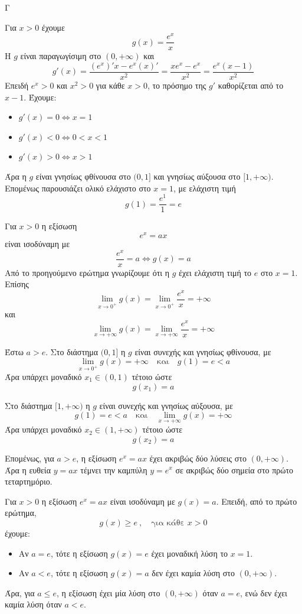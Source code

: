 \begin{thema}{Γ}
\begin{erwthma}
\item Για $x>0$ έχουμε
\[g(x)=\frac{e^x}{x}\]
Η $g$ είναι παραγωγίσιμη στο $(0,+\infty)$ και
\[g'(x)=\frac{(e^x)'x-e^x(x)'}{x^2}=\frac{xe^x-e^x}{x^2}=\frac{e^x(x-1)}{x^2}\]
Επειδή $e^x>0$ και $x^2>0$ για κάθε $x>0$, το πρόσημο της $g'$ καθορίζεται από το $x-1$.
Έχουμε:
\begin{itemize}
\item $g'(x)=0\Leftrightarrow x=1$
\item $g'(x)<0\Leftrightarrow 0<x<1$
\item $g'(x)>0\Leftrightarrow x>1$
\end{itemize}
Άρα η $g$ είναι γνησίως φθίνουσα στο $(0,1]$ και γνησίως αύξουσα στο $[1,+\infty)$.
Επομένως παρουσιάζει ολικό ελάχιστο στο $x=1$, με ελάχιστη τιμή
\[g(1)=\frac{e^1}{1}=e\]

\item Για $x>0$ η εξίσωση
\[e^x=ax\]
είναι ισοδύναμη με
\[\frac{e^x}{x}=a\Leftrightarrow g(x)=a\]
Από το προηγούμενο ερώτημα γνωρίζουμε ότι η $g$ έχει ελάχιστη τιμή το $e$ στο $x=1$.
Επίσης
\[\lim\limits_{x\to 0^+}g(x)=\lim\limits_{x\to 0^+}\frac{e^x}{x}=+\infty\]
και
\[\lim\limits_{x\to+\infty}g(x)=\lim\limits_{x\to+\infty}\frac{e^x}{x}=+\infty\]

Έστω $a>e$.
Στο διάστημα $(0,1]$ η $g$ είναι συνεχής και γνησίως φθίνουσα, με
\[\lim\limits_{x\to 0^+}g(x)=+\infty\quad \text{και}\quad g(1)=e<a\]
Άρα υπάρχει μοναδικό $x_1\in(0,1)$ τέτοιο ώστε
\[g(x_1)=a\]

Στο διάστημα $[1,+\infty)$ η $g$ είναι συνεχής και γνησίως αύξουσα, με
\[g(1)=e<a\quad \text{και}\quad \lim\limits_{x\to+\infty}g(x)=+\infty\]
Άρα υπάρχει μοναδικό $x_2\in(1,+\infty)$ τέτοιο ώστε
\[g(x_2)=a\]

Επομένως, για $a>e$, η εξίσωση $e^x=ax$ έχει ακριβώς δύο λύσεις στο $(0,+\infty)$.
Άρα η ευθεία $y=ax$ τέμνει την καμπύλη $y=e^x$ σε ακριβώς δύο σημεία στο πρώτο τεταρτημόριο.

\item Για $x>0$ η εξίσωση $e^x=ax$ είναι ισοδύναμη με $g(x)=a$.
Επειδή, από το πρώτο ερώτημα,
\[g(x)\geq e\ ,\quad \text{για κάθε }x>0\]
έχουμε:
\begin{itemize}
\item Αν $a=e$, τότε η εξίσωση $g(x)=e$ έχει μοναδική λύση το $x=1$.
\item Αν $a<e$, τότε η εξίσωση $g(x)=a$ δεν έχει καμία λύση στο $(0,+\infty)$.
\end{itemize}
Άρα, για $a\leq e$, η εξίσωση έχει μία λύση στο $(0,+\infty)$ όταν $a=e$, ενώ δεν έχει καμία λύση όταν $a<e$.


\end{erwthma}
\end{thema}
